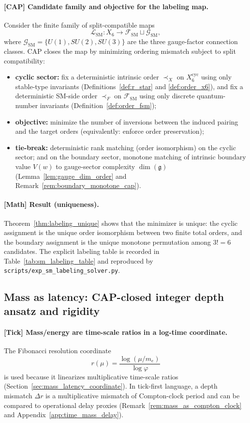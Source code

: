 \paragraph{[CAP] Candidate family and objective for the labeling map.}
Consider the finite family of split-compatible maps
\[
\mathcal{L}_{\mathrm{SM}}:X_6\to \mathcal{F}_{\mathrm{SM}}\sqcup\mathcal{G}_{\mathrm{SM}},
\]
where $\mathcal{G}_{\mathrm{SM}}=\{U(1),SU(2),SU(3)\}$ are the three gauge-factor connection classes.
CAP closes the map by minimizing ordering mismatch subject to split compatibility:
\begin{itemize}
\item \textbf{cyclic sector:} fix a deterministic intrinsic order $\prec_X$ on $X_6^{\mathrm{cyc}}$ using only stable-type invariants (Definitions~\ref{def:r_star} and \ref{def:order_x6}), and fix a deterministic SM-side order $\prec_F$ on $\mathcal{F}_{\mathrm{SM}}$ using only discrete quantum-number invariants (Definition~\ref{def:order_fsm});
\item \textbf{objective:} minimize the number of inversions between the induced pairing and the target orders (equivalently: enforce order preservation);
\item \textbf{tie-break:} deterministic rank matching (order isomorphism) on the cyclic sector; and on the boundary sector, monotone matching of intrinsic boundary value $V(w)$ to gauge-sector complexity $\dim(\mathfrak{g})$ (Lemma~\ref{lem:gauge_dim_order} and Remark~\ref{rem:boundary_monotone_cap}).
\end{itemize}

\paragraph{[Math] Result (uniqueness).}
Theorem~\ref{thm:labeling_unique} shows that the minimizer is unique: the cyclic assignment is the unique order isomorphism between two finite total orders, and the boundary assignment is the unique monotone permutation among $3!=6$ candidates.
The explicit labeling table is recorded in Table~\ref{tab:sm_labeling_table} and reproduced by \texttt{scripts/exp\_sm\_labeling\_solver.py}.

\subsection{Mass as latency: CAP-closed integer depth ansatz and rigidity}
\label{subsec:tick_cap_mass}

\paragraph{[Tick] Mass/energy are time-scale ratios in a log-time coordinate.}
The Fibonacci resolution coordinate
\[
r(\mu)=\frac{\log(\mu/m_e)}{\log\varphi}
\]
is used because it linearizes multiplicative time-scale ratios (Section~\ref{sec:mass_latency_coordinate}).
In tick-first language, a depth mismatch $\Delta r$ is a multiplicative mismatch of Compton-clock period and can be compared to operational delay proxies (Remark~\ref{rem:mass_as_compton_clock} and Appendix~\ref{app:time_mass_delay}).

